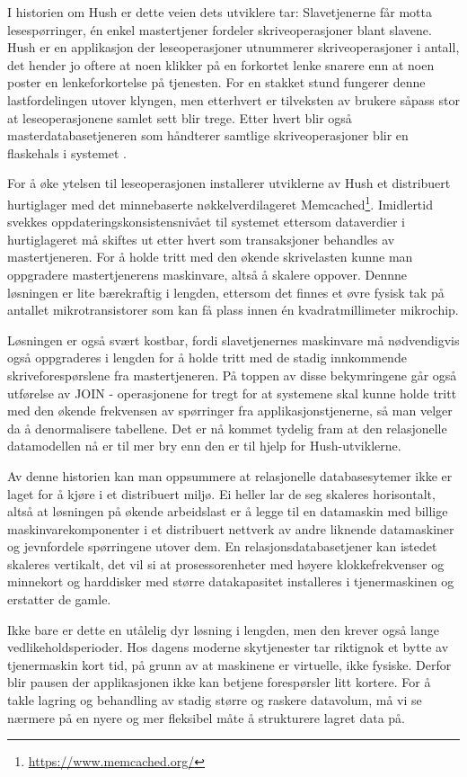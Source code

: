 I historien om Hush er dette veien dets utviklere tar: Slavetjenerne får motta lesespørringer, én enkel mastertjener fordeler skriveoperasjoner blant slavene. Hush er en applikasjon der leseoperasjoner utnummerer skriveoperasjoner i antall, det hender jo oftere at noen klikker på en forkortet lenke snarere enn at noen poster en lenkeforkortelse på tjenesten. For en stakket stund fungerer denne lastfordelingen utover klyngen, men etterhvert er tilveksten av brukere såpass stor at leseoperasjonene samlet sett blir trege. Etter hvert blir også masterdatabasetjeneren som håndterer samtlige skriveoperasjoner blir en flaskehals i systemet \citep{george2011}.

For å øke ytelsen til leseoperasjonen installerer utviklerne av Hush et distribuert hurtiglager med det minnebaserte nøkkelverdilageret Memcached\footnote{\url{https://www.memcached.org/}}. Imidlertid svekkes oppdateringskonsistensnivået til systemet ettersom dataverdier i hurtiglageret må skiftes ut etter hvert som transaksjoner behandles av mastertjeneren. For å holde tritt med den økende skrivelasten kunne man oppgradere mastertjenerens maskinvare, altså å skalere oppover. Dennne løsningen er lite bærekraftig i lengden, ettersom det finnes et øvre fysisk tak på antallet mikrotransistorer som kan få plass innen én kvadratmillimeter mikrochip.

Løsningen er også svært kostbar, fordi slavetjenernes maskinvare må nødvendigvis også oppgraderes i lengden for å holde tritt med de stadig innkommende skriveforespørslene fra mastertjeneren. På toppen av disse bekymringene går også utførelse av JOIN - operasjonene for tregt for at systemene skal kunne holde tritt med den økende frekvensen av spørringer fra applikasjonstjenerne, så man velger da å denormalisere tabellene. Det er nå kommet tydelig fram at den relasjonelle datamodellen nå er til mer bry enn den er til hjelp for Hush-utviklerne.

Av denne historien kan man oppsummere at relasjonelle databasesytemer ikke er laget for å kjøre i et distribuert miljø. Ei heller lar de seg skaleres horisontalt, altså at løsningen på økende arbeidslast er å legge til en datamaskin med billige maskinvarekomponenter i et distribuert nettverk av andre liknende datamaskiner og jevnfordele spørringene utover dem. En relasjonsdatabasetjener kan istedet skaleres vertikalt, det vil si at prosessorenheter med høyere klokkefrekvenser og minnekort og harddisker med større datakapasitet installeres i tjenermaskinen og erstatter de gamle.

Ikke bare er dette en utålelig dyr løsning i lengden, men den krever også lange vedlikeholdsperioder. Hos dagens moderne skytjenester tar riktignok et bytte av tjenermaskin kort tid, på grunn av at maskinene er virtuelle, ikke fysiske. Derfor blir pausen der applikasjonen ikke kan betjene forespørsler litt kortere. For å takle lagring og behandling av stadig større og raskere datavolum, må vi se nærmere på en nyere og mer fleksibel måte å strukturere lagret data på.
